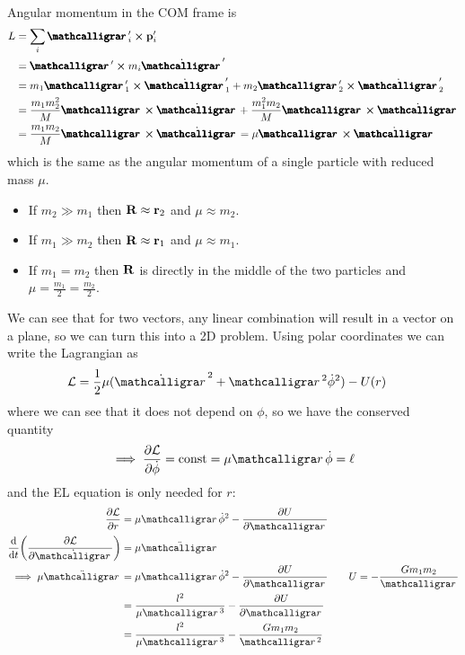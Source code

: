 \documentclass[../main.tex]{subfiles}
\begin{document}
\paragraph*{} Angular momentum in the COM frame is
\begin{align*}
    L &= \sum_i \boldscriptr'_i \cross \vb p'_i \\
    &= \boldscriptr' \cross m_i \dot{\boldscriptr}' \\
    &= m_1 \boldscriptr'_1 \cross \dot{\boldscriptr}'_1 + m_2 \boldscriptr'_2 \cross \dot{\boldscriptr}'_2 \\
    &= \frac{m_1 m_2^2}{M} \boldscriptr \cross \dot{\boldscriptr} + \frac{m_1^2 m_2}{M} \boldscriptr \cross \dot{\boldscriptr} \\
    &= \frac{m_1 m_2}{M} \boldscriptr \cross \dot {\boldscriptr} = \mu \boldscriptr \cross \dot{\boldscriptr}
\end{align*}
which is the same as the angular momentum of a single particle with reduced mass $\mu$.
\begin{itemize}
    \item If $m_2 \gg m_1$ then $\vb R \approx \vb r_2$ and $\mu \approx m_2$. 
    \item If $m_1 \gg m_2$ then $\vb R \approx \vb r_1$ and $\mu \approx m_1$.
    \item If $m_1 = m_2$ then $\vb R$ is directly in the middle of the two particles and $\mu = \frac{m_1}{2} = \frac{m_2}{2}$.
\end{itemize}
We can see that for two vectors, any linear combination will result in a vector on a plane, so we 
can turn this into a 2D problem. Using polar coordinates we can write the Lagrangian as
\begin{align*}
    \lagr &= \frac{1}{2} \mu (\dot\scriptr^2 + \scriptr^2 \dot\phi^2) - U(r) 
\end{align*}
where we can see that it does not depend on $\phi$, so we have the conserved quantity
\begin{align*}
    \implies \pdv{\lagr}{\dot\phi} = \text{const} = \mu \scriptr \dot\phi = \ell
\end{align*}
and the EL equation is only needed for $r$:
\begin{align*}
    \pdv{\lagr}{r} &= \mu \scriptr \dot\phi^2 - \pdv{U}{\scriptr} \\
    \dv{t}(\pdv{\lagr}{\dot\scriptr}) &= \mu \ddot\scriptr \\
    \implies \mu \ddot\scriptr &= \mu \scriptr \dot\phi^2 - \pdv{U}{\scriptr} 
        \qquad U = -\frac{G m_1 m_2}{\scriptr} \\
    &= \frac{l^2}{\mu \scriptr^3} - \pdv{U}{\scriptr} \\
    &= \frac{l^2}{\mu \scriptr^3} - \frac{G m_1 m_2}{\scriptr^2}
\end{align*}
\end{document}

